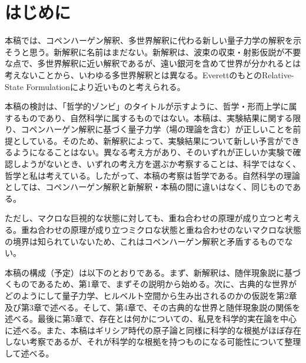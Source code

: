 \section*{はじめに}
本稿では、コペンハーゲン解釈、多世界解釈に代わる新しい量子力学の解釈を示そうと思う。新解釈に名前はまだない。新解釈は、波束の収束・射影仮説が不要な点で、多世界解釈に近い解釈であるが、遠い銀河を含めて世界が分かれるとは考えないことから、いわゆる多世界解釈とは異なる。EverettのもとのRelative-State Formulationにより近いものと考えられる。\par
本稿の検討は、「哲学的ゾンビ」のタイトルが示すように、哲学・形而上学に属するものであり、自然科学に属するものではない。本稿は、実験結果に関する限り、コペンハーゲン解釈に基づく量子力学（場の理論を含む）が正しいことを前提としている。そのため、新解釈によって、実験結果について新しい予言ができるようになることはない。異なる考え方があり、そのいずれが正しいか実験で確認しようがないとき、いずれの考え方を選ぶか考察することは、科学ではなく、哲学と私は考えている。したがって、本稿の考察は哲学である。自然科学の理論としては、コペンハーゲン解釈と新解釈・本稿の間に違いはなく、同じものである。\par
ただし、マクロな巨視的な状態に対しても、重ね合わせの原理が成り立つと考える。重ね合わせの原理が成り立つミクロな状態と重ね合わせのないマクロな状態の境界は知られていないため、これはコペンハーゲン解釈と矛盾するものでない。\par
本稿の構成（予定）は以下のとおりである。まず、新解釈は、随伴現象説に基づくものであるため、第1章で、まずその説明から始める。次に、古典的な世界がどのようにして量子力学、ヒルベルト空間から生み出されるのかの仮説を第2章及び第3章で述べる。そして、第4章で、その古典的な世界と随伴現象説の関係を述べる。最後に第5章で、存在とは何かについての、私見を科学的実在論を中心に述べる。また、本稿はギリシア時代の原子論と同様に科学的な根拠がほぼ存在しない考察であるが、それが科学的な根拠を持つものになる可能性について整理して述べる。